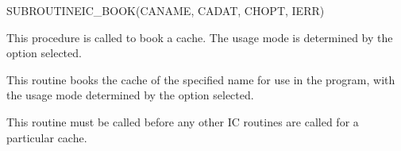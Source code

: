 \begin{routine} %
\subroutine
   {SUBROUTINE}{IC\_BOOK}{(CANAME, CADAT, CHOPT, IERR)}
\begin{overview}
This procedure is called to book a cache. The usage mode is determined
by the option selected.
\end{overview}
\begin{argdeflist}
\end{argdeflist}
\begin{describe}
This routine books the cache of the specified name for use in the program,
with the usage mode determined by the option selected.

This routine must be called before any other IC routines are called for
a particular cache.


\end{describe}
\end{routine}
